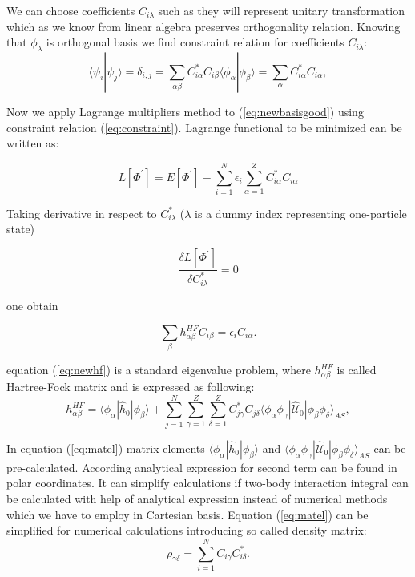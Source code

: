 \documentclass[10pt]{article}
\newcommand*{\hatU}{\hat{\mathcal{U}}}
\begin{document}
We can choose coefficients $C_{i \lambda}$ such as they will represent unitary transformation which as we know from linear algebra preserves orthogonality relation. Knowing that $\phi_{\lambda}$ is orthogonal basis we find constraint relation for coefficients $C_{i \lambda}$:
\begin{equation}
\langle \psi_i | \psi_j \rangle=\delta_{i,j}=\sum_{\alpha\beta} C^*_{i\alpha}C_{i\beta}\langle \phi_\alpha | \phi_\beta \rangle = \sum_{\alpha} C^*_{i\alpha}C_{i\alpha},
\label{eq:constraint}
\end{equation}

Now we apply Lagrange multipliers method to (\ref{eq:newbasisgood}) using constraint relation (\ref{eq:constraint}). Lagrange functional to be minimized can be written as:

\begin{equation}
L[\Phi^{\prime}] = E[\Phi^{\prime}] - \sum_{i=1}^N\epsilon_i\sum_{\alpha=1}^Z C^*_{i\alpha}C_{i\alpha}
\end{equation}

Taking derivative in respect to $C^*_{i\lambda}$ ($\lambda$ is a dummy index representing one-particle state)

\begin{equation}
\frac {\delta L[\Phi^{\prime}]}{\delta C^*_{i\lambda}} = 0
\end{equation}

one obtain 

\begin{equation}
\sum_{\beta}h_{\alpha\beta}^{HF}C_{i\beta}=\epsilon_iC_{i\alpha}. \label{eq:newhf}
\end{equation}

equation (\ref{eq:newhf}) is a standard eigenvalue problem, where $h_{\alpha\beta}^{HF}$ is called Hartree-Fock matrix and is expressed as following:
\begin{equation}\label{eq:matel}
h_{\alpha\beta}^{HF}=\langle \phi_{\alpha} | \hat{h}_0 | \phi_{\beta} \rangle+
\sum_{j=1}^N\sum_{\gamma=1}^Z\sum_{\delta=1}^Z C^*_{j\gamma}C_{j\delta}\langle \phi_{\alpha}\phi_{\gamma}|\hatU_{0}|\phi_{\beta}\phi_{\delta}\rangle_{AS},
\end{equation}

In equation (\ref{eq:matel}) matrix elements $\langle \phi_{\alpha} | \hat{h}_0 | \phi_{\beta} \rangle$ and $\langle \phi_{\alpha}\phi_{\gamma}|\hatU_{0}|\phi_{\beta}\phi_{\delta}\rangle_{AS}$ can be pre-calculated. According \cite{Anisimovas} analytical expression for second term can be found in polar coordinates. It can simplify calculations if two-body interaction integral can be calculated with help of analytical expression instead of numerical methods which we have to employ in Cartesian basis. 
Equation (\ref{eq:matel}) can be simplified for numerical calculations introducing so called density matrix:
\begin{equation}
\rho_{\gamma\delta} = \sum_{i=1}^{N}C_{i\gamma}C^*_{i\delta}.
\label{_auto10}
\end{equation}
\end{document}
